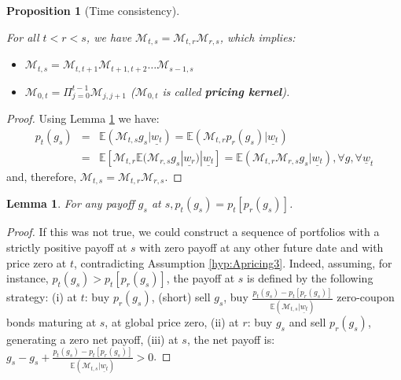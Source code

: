 \documentclass[
  12pt,
]{book}
\providecommand{\tightlist}{%
  \setlength{\itemsep}{0pt}\setlength{\parskip}{0pt}}
\newtheorem{lemma}{Lemma}[chapter]
\newtheorem{proposition}{Proposition}[chapter]
\theoremstyle{definition}
\theoremstyle{definition}
\theoremstyle{definition}
\theoremstyle{definition}
\theoremstyle{remark}
\begin{document}
\begin{proposition}[Time consistency]
\protect\hypertarget{prp:timeconsist}{}\label{prp:timeconsist}

For all \(t < r < s\), we have \(\mathcal{M}_{t,s} = \mathcal{M}_{t,r} \mathcal{M}_{r,s}\), which implies:

\begin{itemize}
\tightlist
\item
  \(\mathcal{M}_{t,s} = \mathcal{M}_{t,t+1} \mathcal{M}_{t+1,t+2}\dots\mathcal{M}_{s-1,s}\)
\item
  \(\mathcal{M}_{0,t} = \Pi^{t-1}_{j=0} \mathcal{M}_{j,j+1}\) (\(\mathcal{M}_{0,t}\) is called \textbf{pricing kernel}).
\end{itemize}

\end{proposition}

\begin{proof}
Using Lemma \ref{lem:sdf} we have:
\begin{eqnarray*}
p_t(g_s) &=& \mathbb{E}(\mathcal{M}_{t,s}g_s|\underline{w_t}) = \mathbb{E}(\mathcal{M}_{t,r} p_r(g_s)|\underline{w_t}) \\
&=& \mathbb{E}[\mathcal{M}_{t,r}\mathbb{E}(\mathcal{M}_{r,s} g_s|\underline{w_r})|\underline{w_t}] = \mathbb{E}(\mathcal{M}_{t,r} \mathcal{M}_{r,s} g_s|\underline{w_t}), \forall g, \forall \underline{w}_{t}
\end{eqnarray*}
and, therefore, \(\mathcal{M}_{t,s} = \mathcal{M}_{t,r}\mathcal{M}_{r,s}\).
\end{proof}

\begin{lemma}
\protect\hypertarget{lem:sdf}{}\label{lem:sdf}For any payoff \(g_s\) at \(s, p_t(g_s) = p_t[p_r(g_s)]\).
\end{lemma}

\begin{proof}
If this was not true, we could construct a sequence of portfolios with a strictly positive payoff at \(s\) with zero payoff at any other future date and with price zero at \(t\), contradicting Assumption \ref{hyp:Apricing3}. Indeed, assuming, for instance, \(p_t(g_s) > p_t[p_r(g_s)]\), the payoff at \(s\) is defined by the following strategy: (i) at \(t\): buy \(p_r(g_s)\), (short) sell \(g_s\), buy
\(\frac{p_t(g_s)-p_t[p_r(g_s)]}{\mathbb{E}(\mathcal{M}_{t,s}|\underline{w_t})}\) zero-coupon bonds maturing at \(s\), at global price zero, (ii) at \(r\): buy \(g_s\) and sell \(p_r(g_s)\), generating a zero net payoff, (iii) at \(s\), the net payoff is: \(g_s-g_s+\frac{p_t(g_s)-p_t[p_r(g_s)]}{\mathbb{E}(\mathcal{M}_{t,s}|\underline{w_t})} > 0\).
\end{proof}
\end{document}
